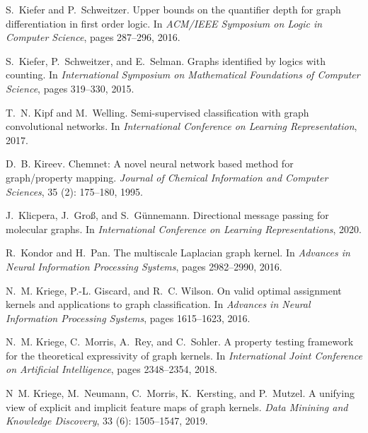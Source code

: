 \documentclass{article}
\theoremstyle{definition}
\begin{document}
\begin{thebibliography}{125}
	S.~Kiefer and P.~Schweitzer.
	\newblock Upper bounds on the quantifier depth for graph differentiation in
	first order logic.
	\newblock In \emph{{ACM/IEEE} Symposium on Logic in Computer Science}, pages
	287--296, 2016.
	
	S.~Kiefer, P.~Schweitzer, and E.~Selman.
	\newblock Graphs identified by logics with counting.
	\newblock In \emph{International Symposium on Mathematical Foundations of
		Computer Science}, pages 319--330, 2015.
	
	T.~N. Kipf and M.~Welling.
	\newblock Semi-supervised classification with graph convolutional networks.
	\newblock In \emph{International Conference on Learning Representation}, 2017.
	
	D.~B. Kireev.
	\newblock Chemnet: A novel neural network based method for graph/property
	mapping.
	\newblock \emph{Journal of Chemical Information and Computer Sciences},
	35 (2): 175--180, 1995.
	
	J.~Klicpera, J.~Gro{\ss}, and S.~G{\"{u}}nnemann.
	\newblock Directional message passing for molecular graphs.
	\newblock In \emph{International Conference on Learning Representations}, 2020.
	
	R.~Kondor and H.~Pan.
	\newblock The multiscale {L}aplacian graph kernel.
	\newblock In \emph{Advances in Neural Information Processing Systems}, pages
	2982--2990, 2016.
	
	N.~M. Kriege, P.-L. Giscard, and R.~C. Wilson.
	\newblock On valid optimal assignment kernels and applications to graph
	classification.
	\newblock In \emph{Advances in Neural Information Processing Systems}, pages
	1615--1623, 2016.
	
	N.~M. Kriege, C.~Morris, A.~Rey, and C.~Sohler.
	\newblock A property testing framework for the theoretical expressivity of
	graph kernels.
	\newblock In \emph{International Joint Conference on Artificial Intelligence},
	pages 2348--2354, 2018.
	
	N~M. Kriege, M.~Neumann, C.~Morris, K.~Kersting, and P.~Mutzel.
	\newblock A unifying view of explicit and implicit feature maps of graph
	kernels.
	\newblock \emph{Data Minining and Knowledge Discovery}, 33
	(6): 1505--1547, 2019.
	

\end{thebibliography}
\end{document}
